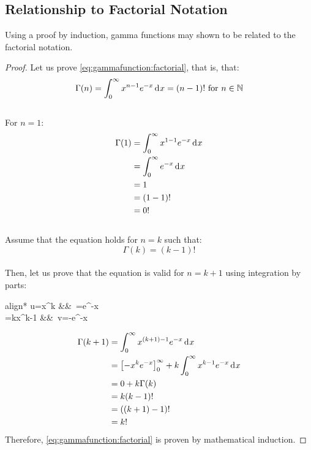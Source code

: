 \documentclass[12pt]{article}
\begin{document}

\pagebreak
\subsection{Relationship to Factorial Notation}
Using a proof by induction, gamma functions may shown to be related to the factorial notation.
\begin{proof}
	Let us prove \autoref{eq:gammafunction:factorial}, that is, that:\\[-18pt]
	\begin{equation}
		\Gamma(n) = \int^\infty_0 x^{n-1}e^{-x}\mathop{}\!\mathrm{d^{}}x = (n-1)!\text{ for }n\in\mathbb{N}
	\end{equation}\\[-30pt]
	For $n=1$:\\[-18pt]
	\begin{equation}
		\begin{split}
			\Gamma(1)	&=	\int^\infty_0 x^{1-1}e^{-x}\mathop{}\!\mathrm{d^{}}x\\
						&=	\int^\infty_0 e^{-x}\mathop{}\!\mathrm{d^{}}x\\
						&=	1\\
						&=	(1-1)!\\
						&=	0!
		\end{split}
	\end{equation}\\[-24pt]
	Assume that the equation holds for $n=k$ such that:\\[-18pt]
	\begin{equation}
		\Gamma(k) = (k-1)!
	\end{equation}\\[-30pt]
	Then, let us prove that the equation is valid for $n=k+1$ using integration by parts:\\[-12pt]
	\begin{empheq}[box=\widefbox]{align*}
		u=x^{k}						&&\,	=e^{-x}\\
		=kx^{k-1}	&&\,	v=-e^{-x}
	\end{empheq}
	\begin{equation}
		\begin{split}
			\Gamma(k+1)	&=	\int^\infty_0 x^{(k+1)-1}e^{-x}\mathop{}\!\mathrm{d^{}}x\\
						&=	\left[-x^k e^{-x}\right]^\infty_0 + k\int^\infty_0 x^{k-1}e^{-x}\mathop{}\!\mathrm{d^{}}x\\
						&=	0 +k\Gamma(k)\\
						&=	k(k-1)!\\
						&=	((k+1)-1)!\\
						&=	k!
		\end{split}
	\end{equation}
	Therefore, \autoref{eq:gammafunction:factorial} is proven by mathematical induction.
\end{proof}
\end{document}
